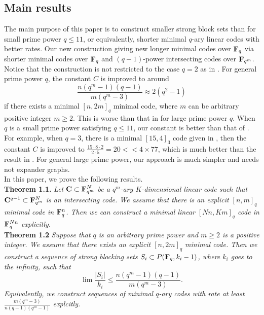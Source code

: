 \documentclass[12pt]{article}
\begin{document}
\subsection{Main results}





The main purpose of this paper is to construct smaller strong block sets than \cite{Alon} for small prime power $q \leq 11$, or equivalently, shorter minimal $q$-ary linear codes with better rates. Our new construction giving new longer minimal codes over ${\bf F}_q$ via shorter minimal codes over ${\bf F}_q$ and $(q-1)$-power intersecting codes over ${\bf F}_{q^m}$. Notice that the construction is not restricted to the case $q=2$ as in \cite{Borello}. For general prime power $q$, the constant $C$ is improved to around $$\frac{n(q^m-1)(q-1)}{m(q^m-3)}\approx 2(q^2-1)$$ if there exists a minimal $[n,2m]_q$ minimal code, where $m$ can be arbitrary positive integer $m \geq 2$. This is worse than that in \cite{Alon} for large prime power $q$. When $q$ is a small prime power satisfying $q\leq 11$, our constant is better than that of \cite{Alon}. For example, when $q=3$, there is a minimal $[15,4]_3$ code given in \cite[Page11]{Kurz}, then the constant $C$ is improved to $\frac{15 \cdot 8 \cdot 2}{2 \cdot 5}=20 << 4 \times 77$, which is much better than the result in \cite[Table 3]{Alon}. For general large prime power, our approach is much simpler and needs not expander graphs.\\


In this paper, we prove the following results.\\

{\bf Theorem 1.1.} {\em Let ${\bf C} \subset {\bf F}_{q^m}^N$ be a $q^m$-ary $K$-dimensional linear code such that ${\bf C}^{q-1}\subset {\bf F}_{q^m}^N$ is an intersecting code. We assume that there is an explicit $[n,m]_q$ minimal code in ${\bf F}_q^n$. Then we can construct a minimal linear $[Nn,Km]_q$ code in ${\bf F}_q^{Nn}$ explicitly.}\\


{\bf Theorem 1.2} {\em Suppose that $q$ is an arbitrary prime power and $m \geq 2$ is a positive integer. We assume that there exists an explicit $[n,2m]_q$ minimal code. Then we construct a sequence of strong blocking sets $S_i \subset P({\bf F}_q, k_i-1)$, where $k_i$ goes to the infinity, such that $$\lim\frac{|S_i|}{k_i}\leq \frac{n(q^m-1)(q-1)}{m(q^m-3)}.$$ Equivalently, we construct sequences of minimal $q$-ary codes with rate at least $\frac{m(q^m-3)}{n(q-1)(q^m-1)}$ explcitly.}\\
\end{document}

